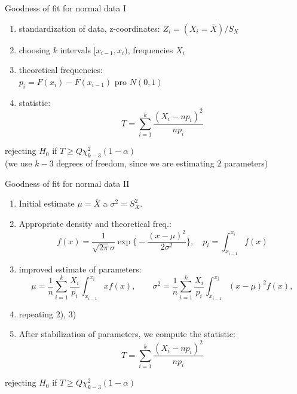 \documentclass[smaller]{beamer}
\def\ol#1{\overline{#1}}
\begin{document}
\begin{frame}{Goodness of fit for normal data I} 
\begin{enumerate}
 \item standardization of data, z-coordinates: $Z_i = (X_i = \ol{X}) / S_X $
 \item choosing $k$ intervals $[x_{i-1}, x_i)$, frequencies $X_i$
 \item theoretical frequencies:\\
 $p_i = F(x_{i}) - F(x_{i-1})$ pro $N(0,1)$
 \item statistic:
\[
 T=\sum_{i=1}^k \frac{ (X_i - np_i)^2}{np_i} 
\]
\end{enumerate}
rejecting $H_0$ if $T \ge Q\chi^2_{k-3} (1-\alpha)$\\
 (we use  $k-3$ degrees of freedom, since we are estimating $2$ parameters)
\end{frame}

\begin{frame}{Goodness of fit for normal data II}
\begin{enumerate}
 \item Initial estimate $\mu = \ol{X}$ a $\sigma^2 = S_X^2$.
 \item Appropriate density and theoretical freq.:
\[
 f(x)=\frac{1}{\sqrt{2\pi}\sigma} \exp\Big\{-\frac{(x-\mu)^2}{2\sigma^2}\Big\},\quad p_i = \int_{x_{i-1}}^{x_i} f(x)
\]
  \item  improved estimate of parameters: 
\[
 \mu = \frac{1}{n}\sum_{i=1}^{k} \frac{X_i}{p_i} \int_{x_{i-1}}^{x_i} xf(x),
 \qquad
 \sigma^2 = \frac{1}{n}\sum_{i=1}^{k} \frac{X_i}{p_i} \int_{x_{i-1}}^{x_i} (x - \mu)^2 f(x),
\]
\item repeating 2), 3)
\item After stabilization of parameters, we compute the statistic:
\[
 T=\sum_{i=1}^k \frac{ (X_i - np_i)^2}{np_i} 
\]
\end{enumerate}
rejecting $H_0$ if $T \ge Q\chi^2_{k-3} (1-\alpha)$
\end{frame}
\end{document}
